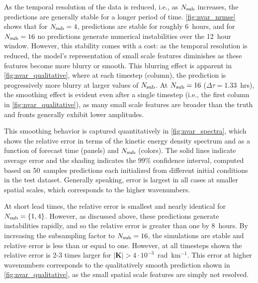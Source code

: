As the temporal resolution of the data is reduced, i.e., as $N_\text{sub}$ increases,
the predictions are generally stable for a longer period of time.
\cref{fig:nvar_nrmse} shows that for $N_\text{sub}=4$, predictions are stable for roughly
6~hours, and for $N_\text{sub}=16$ no predictions generate numerical instabilities over the
12~hour window.
However, this stability comes with a cost: as the temporal resolution is
reduced, the model's representation of small scale features diminishes as these
features become more blurry or smooth.
This blurring effect is apparent in \cref{fig:nvar_qualitative}, where at each
timestep (column), the prediction is progressively more blurry at larger values
of $N_\text{sub}$.
At $N_\text{sub}=16$ ($\Delta \tau = $1.33~hrs), the smoothing effect is
evident even after a single timestep (i.e., the first column in
\cref{fig:nvar_qualitative}),
as many small scale features are broader than the truth and fronts generally
exhibit lower amplitudes.


This smoothing behavior is captured quantitatively in \cref{fig:nvar_spectra},
which shows the relative error in terms of the kinetic energy density spectrum
and as a function of forecast time (panels) and $N_\text{sub}$ (colors).
The solid lines indicate average error and the shading indicates the 99\%
confidence interval, computed based on 50~samples predictions each initialized
from different initial conditions in the test dataset.
Generally speaking, error is largest in all cases at smaller spatial scales,
which corresponds to the higher wavenumbers.

At short lead times, the relative error is smallest and nearly
identical for $N_\text{sub}=\{1,4\}$.
However, as discussed above,
these predictions generate instabilities rapidly, and so the relative error is
greater than one by 8~hours.
By increasing the subsampling factor to $N_\text{sub}=16$, the simulations are stable
and relative error is less than or equal to one.
However, at all timesteps shown the relative error is 2-3 times larger for
$|\mathbf{K}| > 4\cdot10^{-3}$~rad~km$^{-1}$.
This error at higher wavenumbers corresponds to the qualitatively smooth
prediction shown in \cref{fig:nvar_qualitative}, as the small spatial scale
features are simply not resolved.

